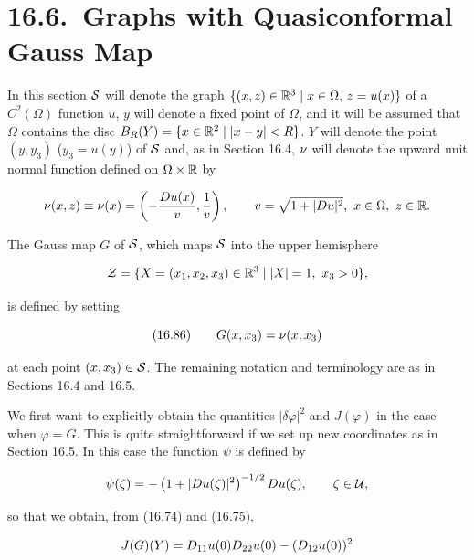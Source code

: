 \bigskip

\section*{16.6.\ Graphs with Quasiconformal Gauss Map}

In this section $\mathcal{S}$ will denote the graph $\{(x, z) \in \mathbb{R}^3 \mid x \in \Omega,\, z = u(x)\}$ of a $C^2(\Omega)$ function $u$, $y$ will denote a fixed point of $\Omega$, and it will be assumed that $\Omega$ contains the disc $B_R(Y) = \{x \in \mathbb{R}^2 \mid |x-y| < R\}$. $Y$ will denote the point $(y, y_3)$ ($y_3 = u(y)$) of $\mathcal{S}$ and, as in Section 16.4, $\nu$ will denote the upward unit normal function defined on $\Omega \times \mathbb{R}$ by

\[
\nu(x,z) \equiv \nu(x) = \left(-\frac{D u(x)}{v}, \frac{1}{v}\right), \qquad v = \sqrt{1+|D u|^2}, \ x \in \Omega, \ z \in \mathbb{R}.
\]

\noindent The Gauss map $G$ of $\mathcal{S}$, which maps $\mathcal{S}$ into the upper hemisphere

\[
\mathcal{Z} = \{X=(x_1,x_2,x_3)\in \mathbb{R}^3 \mid |X|=1, \ x_3>0\},
\]

\noindent is defined by setting

\[
(16.86)\qquad G(x,x_3)=\nu(x,x_3)
\]

\noindent at each point $(x,x_3)\in \mathcal{S}$. The remaining notation and terminology are as in Sections 16.4 and 16.5.

\noindent We first want to explicitly obtain the quantities $|\delta \varphi|^2$ and $J(\varphi)$ in the case when $\varphi=G$. This is quite straightforward if we set up new coordinates as in Section 16.5. In this case the function $\psi$ is defined by

\[
\psi(\zeta) = -\left(1 + |D u(\zeta)|^2\right)^{-1/2}D u(\zeta), \qquad \zeta \in \mathcal{U},
\]

\noindent so that we obtain, from (16.74) and (16.75),

\[
J(G)(Y)=D_{11}u(0)D_{22}u(0)-(D_{12}u(0))^2
\]



